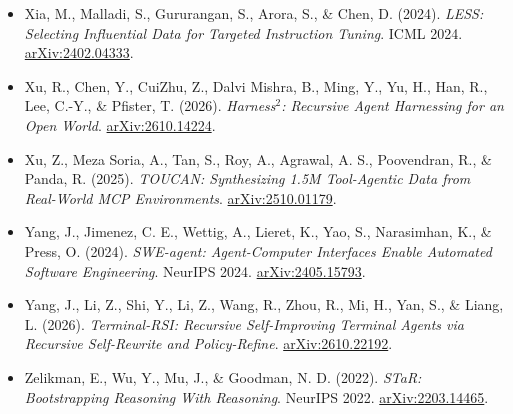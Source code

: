 \documentclass[
  10pt,
]{article}
\begin{document}
\begin{itemize}
  \href{https://arxiv.org/abs/2603.12011}{arXiv:2603.12011}.
\item
  Xia, M., Malladi, S., Gururangan, S., Arora, S., \& Chen, D. (2024).
  \emph{LESS: Selecting Influential Data for Targeted Instruction
  Tuning}. ICML 2024.
  \href{https://arxiv.org/abs/2402.04333}{arXiv:2402.04333}.
\item
  Xu, R., Chen, Y., CuiZhu, Z., Dalvi Mishra, B., Ming, Y., Yu, H., Han,
  R., Lee, C.-Y., \& Pfister, T. (2026). \emph{Harness\(^2\): Recursive
  Agent Harnessing for an Open World}.
  \href{https://arxiv.org/abs/2610.14224}{arXiv:2610.14224}.
\item
  Xu, Z., Meza Soria, A., Tan, S., Roy, A., Agrawal, A. S., Poovendran,
  R., \& Panda, R. (2025). \emph{TOUCAN: Synthesizing 1.5M Tool-Agentic
  Data from Real-World MCP Environments}.
  \href{https://arxiv.org/abs/2510.01179}{arXiv:2510.01179}.
\item
  Yang, J., Jimenez, C. E., Wettig, A., Lieret, K., Yao, S., Narasimhan,
  K., \& Press, O. (2024). \emph{SWE-agent: Agent-Computer Interfaces
  Enable Automated Software Engineering}. NeurIPS 2024.
  \href{https://arxiv.org/abs/2405.15793}{arXiv:2405.15793}.
\item
  Yang, J., Li, Z., Shi, Y., Li, Z., Wang, R., Zhou, R., Mi, H., Yan,
  S., \& Liang, L. (2026). \emph{Terminal-RSI: Recursive Self-Improving
  Terminal Agents via Recursive Self-Rewrite and Policy-Refine}.
  \href{https://arxiv.org/abs/2610.22192}{arXiv:2610.22192}.
\item
  Zelikman, E., Wu, Y., Mu, J., \& Goodman, N. D. (2022). \emph{STaR:
  Bootstrapping Reasoning With Reasoning}. NeurIPS 2022.
  \href{https://arxiv.org/abs/2203.14465}{arXiv:2203.14465}.
\end{itemize}
\end{document}
